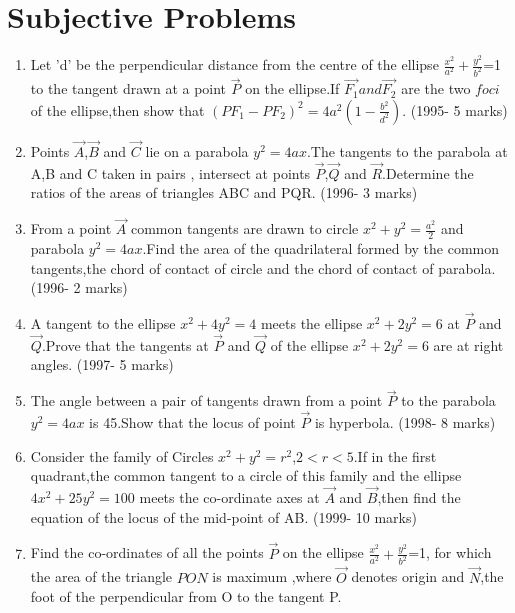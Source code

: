 \documentclass[journal,12pt,twocolumn]{IEEEtran}
\theoremstyle{remark}
\begin{document}
\section{Subjective Problems}
\begin{enumerate}
\item Let 'd' be the perpendicular distance from the centre of the ellipse $\frac{x^2}{a^2}+\frac{y^2}{b^2}$=1  to the tangent drawn at a point $\Vec{P}$ on the ellipse.If $\Vec{F_1} and  \Vec{F_2}$ are the two $foci$ of the ellipse,then show that $(P{F_1}-P{F_2})^2=4a^2(1-\frac{b^2}{d^2})$.
\hfill(1995- 5 marks)\break
\newline
\item Points $\Vec{A}$,$\Vec{B}$ and $\Vec{C}$ lie on a parabola $y^2=4ax$.The tangents to the parabola at A,B and C taken in pairs , intersect at points $\Vec{P}$,$\Vec{Q}$ and $\Vec{R}$.Determine the ratios of the areas of triangles ABC and PQR. \hfill(1996- 3 marks)\break\newline
\item From a point $\Vec{A}$ common tangents  are drawn to circle $x^2+y^2=\frac{a^2}{2}$ and parabola $y^2=4ax$.Find the area of the quadrilateral formed by the common tangents,the chord of contact of circle and the chord of contact of parabola.
\hfill(1996- 2 marks)\break\newline
\item A tangent to the ellipse $x^2+4y^2=4$ meets the ellipse $x^2+2y^2=6$ at $\Vec{P}$ and $\Vec{Q}$.Prove that the tangents at $\Vec{P}$ and $\Vec{Q}$ of the ellipse $x^2+2y^2=6$ are at right angles.
\hfill(1997- 5 marks)\break\newline
\item The angle between a pair of tangents drawn from a point $\Vec{P}$ to the parabola $y^2=4ax$ is 45\degree .Show that the locus of point $\Vec{P}$ is hyperbola.
\hfill(1998- 8 marks)\break\newline
\item Consider the family of Circles $x^2+y^2=r^2$,$2<r<5$.If in the first quadrant,the common tangent to a circle of this family and the ellipse $4x^2+25y^2=100$ meets the co-ordinate axes at $\Vec{A}$ and $\Vec{B}$,then find the equation of the locus of the mid-point  of AB.
\hfill(1999- 10 marks)\\
\item Find the co-ordinates of all the points $\Vec{P}$ on the ellipse $\frac{x^2}{a^2}+\frac{y^2}{b^2}$=1, for which the area of the triangle $PON$ is maximum ,where $\Vec{O}$ denotes origin  and $\Vec{N}$,the foot of the perpendicular from O to the tangent P.

\end{enumerate}
\end{document}
